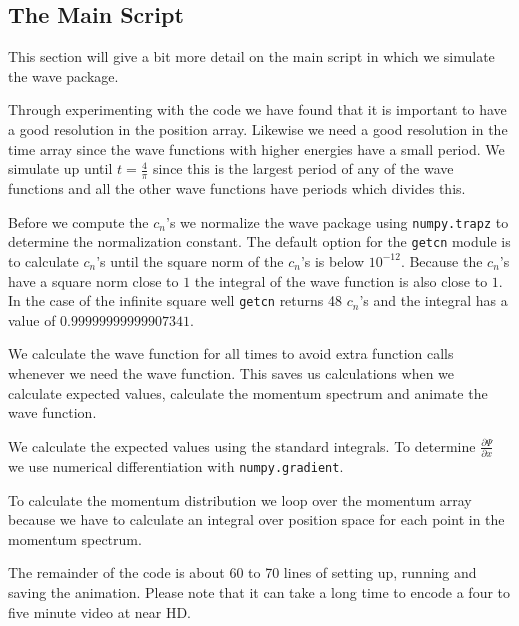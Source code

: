 \documentclass[12pt,a4paper]{article}
\newcommand{\pdiff}[2]{\frac{\partial #1}{\partial #2}}
\begin{document}
\subsection{The Main Script}
This section will give a bit more detail on the main script in which we simulate the wave package.



Through experimenting with the code we have found that it is important to have a good resolution in the position array. Likewise we need a good resolution in the time array since the wave functions with higher energies have a small period. We simulate up until $t = \frac{4}{\pi}$ since this is the largest period of any of the wave functions and all the other wave functions have periods which divides this.



Before we compute the $c_n$'s we normalize the wave package using \lstinline{numpy.trapz} to determine the normalization constant. The default option for the \verb!getcn! module is to calculate $c_n$'s until the square norm of the $c_n$'s is below $10^{-12}$. Because the $c_n$'s have a square norm close to $1$ the integral of the wave function is also close to $1$. In the case of the infinite square well \lstinline{getcn} returns 48 $c_n$'s and the integral has a value of $0.99999999999907341$.



We calculate the wave function for all times to avoid extra function calls whenever we need the wave function. This saves us calculations when we calculate expected values, calculate the momentum spectrum and animate the wave function.



We calculate the expected values using the standard integrals. To determine $\pdiff{\Psi}{x}$ we use numerical differentiation with \lstinline{numpy.gradient}.


To calculate the momentum distribution we loop over the momentum array because we have to calculate an integral over position space for each point in the momentum spectrum.

The remainder of the code is about 60 to 70 lines of setting up, running and saving the animation. Please note that it can take a long time to encode a four to five minute video at near HD.
\end{document}
